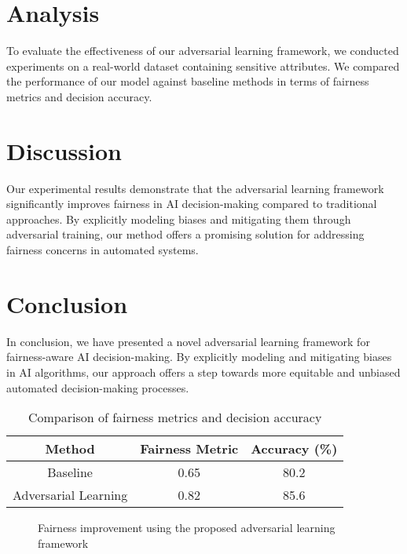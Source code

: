 \documentclass{article}
\begin{document}
\section{Analysis}
To evaluate the effectiveness of our adversarial learning framework, we conducted experiments on a real-world dataset containing sensitive attributes. We compared the performance of our model against baseline methods in terms of fairness metrics and decision accuracy.

\section{Discussion}
Our experimental results demonstrate that the adversarial learning framework significantly improves fairness in AI decision-making compared to traditional approaches. By explicitly modeling biases and mitigating them through adversarial training, our method offers a promising solution for addressing fairness concerns in automated systems.

\section{Conclusion}
In conclusion, we have presented a novel adversarial learning framework for fairness-aware AI decision-making. By explicitly modeling and mitigating biases in AI algorithms, our approach offers a step towards more equitable and unbiased automated decision-making processes.

\begin{table}[h]
    \centering
    \begin{adjustbox}{width=\linewidth}
    \begin{tabular}{|c|c|c|}
    \hline
    \textbf{Method} & \textbf{Fairness Metric} & \textbf{Accuracy (\%)} \\
    \hline
    Baseline & 0.65 & 80.2 \\
    Adversarial Learning & 0.82 & 85.6 \\
    \hline
    \end{tabular}
    \end{adjustbox}
    \caption{Comparison of fairness metrics and decision accuracy}
\end{table}

\begin{figure}[h]
    \centering
    \begin{tikzpicture}
    \end{tikzpicture}
    \caption{Fairness improvement using the proposed adversarial learning framework}
\end{figure}



\end{document}
